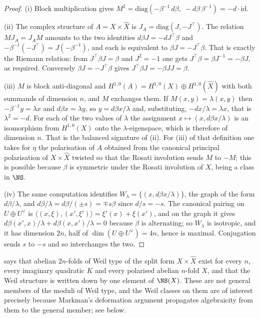 \begin{proof}
(i) Block multiplication gives
$M^{2}=\mathrm{diag}(-\beta^{-1}\,d\beta,\;-d\beta\,\beta^{-1})=-d\cdot\mathrm{id}$.

(ii) The complex structure of $A=X\times\widehat{X}$ is
$J_{A}=\mathrm{diag}(J,-J^{\top})$. The relation $MJ_{A}=J_{A}M$ amounts to
the two identities $d\beta J=-dJ^{\top}\beta$ and
$-\beta^{-1}(-J^{\top})=J(-\beta^{-1})$, and each is equivalent to
$\beta J=-J^{\top}\beta$. That is exactly the Riemann relation: from
$J^{\top}\beta J=\beta$ and $J^{2}=-1$ one gets
$J^{\top}\beta=\beta J^{-1}=-\beta J$, as required. Conversely
$\beta J=-J^{\top}\beta$ gives $J^{\top}\beta J=-\beta J J=\beta$.

(iii) $M$ is block anti-diagonal and $H^{1,0}(A)=H^{1,0}(X)\oplus
H^{1,0}(\widehat{X})$ with both summands of dimension $n$, and $M$ exchanges
them. If $M(x,y)=\lambda(x,y)$ then $-\beta^{-1}y=\lambda x$ and
$d\beta x=\lambda y$, so $y=d\beta x/\lambda$ and, substituting,
$-dx/\lambda=\lambda x$, that is $\lambda^{2}=-d$. For each of
the two values of $\lambda$ the assignment $x\mapsto(x,d\beta x/\lambda)$ is an
isomorphism from $H^{1,0}(X)$ onto the $\lambda$-eigenspace, which is
therefore of dimension $n$. That is the balanced signature of
(ii). For (iii) of that definition one takes for $\eta$ the
polarisation of $A$ obtained from the canonical principal polarisation of
$X\times\widehat{X}$ twisted so that the Rosati involution sends $M$ to $-M$;
this is possible because $\beta$ is symmetric under the Rosati involution of
$X$, being a class in $\NS$.

(iv) The same computation identifies $W_{\lambda}=\{(x,d\beta x/\lambda)\}$,
the graph of the form $d\beta/\lambda$, and
$d\beta/\lambda=d\beta/(\pm s)=\mp s\beta$ since $d/s=-s$. The canonical
pairing on $U\oplus U^{\vee}$ is
$\langle(x,\xi),(x',\xi')\rangle=\xi'(x)+\xi(x')$, and on the graph it gives
$d\beta(x',x)/\lambda+d\beta(x,x')/\lambda=0$ because $\beta$ is alternating; so
$W_{\lambda}$ is isotropic, and it has dimension $2n$, half of
$\dim(U\oplus U^{\vee})=4n$, hence is maximal. Conjugation sends $s$ to $-s$
and so interchanges the two.
\end{proof}

\begin{remark}\label{rem:abundant}
 says that abelian $2n$-folds of Weil type of the split
form $X\times\widehat{X}$ exist for every $n$, every imaginary quadratic $K$
and every polarised abelian $n$-fold $X$, and that the Weil structure is
written down by one element of $\NS(X)$. These are not general members of the
moduli of Weil type, and the Weil classes on them are of interest precisely
because Markman's deformation argument propagates algebraicity from them to
the general member; see  below.
\end{remark}

